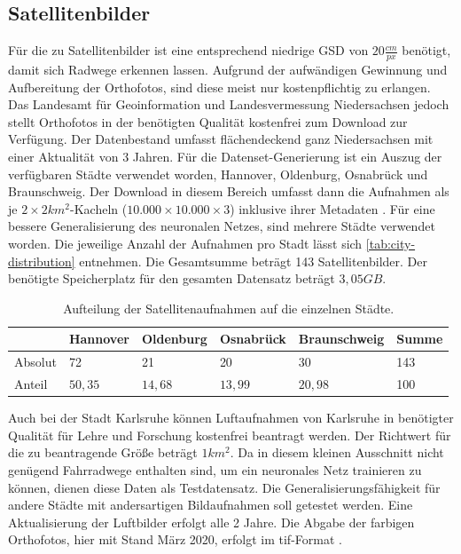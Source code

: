 \subsection{Satellitenbilder}

Für die zu Satellitenbilder ist eine entsprechend niedrige \ac{GSD} von $20 \frac{cm}{px}$ benötigt, damit sich Radwege erkennen lassen. 
Aufgrund der aufwändigen Gewinnung und Aufbereitung der Orthofotos, sind diese meist nur kostenpflichtig zu erlangen.
Das Landesamt für Geoinformation und Landesvermessung Niedersachsen jedoch stellt Orthofotos in der benötigten Qualität kostenfrei zum Download zur Verfügung.
Der Datenbestand umfasst flächendeckend ganz Niedersachsen mit einer Aktualität von 3 Jahren.
Für die Datenset-Generierung ist ein Auszug der verfügbaren Städte verwendet worden, Hannover, Oldenburg, Osnabrück und Braunschweig. 
Der Download in diesem Bereich umfasst dann die Aufnahmen als je $2\times2 km^2$-Kacheln ($10.000\times 10.000\times 3$) inklusive ihrer Metadaten \cite{.26.10.2022}.
Für eine bessere Generalisierung des neuronalen Netzes, sind mehrere Städte verwendet worden.
Die jeweilige Anzahl der Aufnahmen pro Stadt lässt sich \autoref{tab:city-distribution} entnehmen.
Die Gesamtsumme beträgt 143 Satellitenbilder.
Der benötigte Speicherplatz für den gesamten Datensatz beträgt $3,05 GB$.

\begin{table}
	\centering
	\begin{tabular}{l|l|l|l|l|l}
		& Hannover & Oldenburg & Osnabrück & Braunschweig & Summe\\
		\midrule
		Absolut & 72 & 21 & 20 & 30 & 143\\
		Anteil & $50,35$ & $14,68$ & $13,99$ & $20,98$ & 100 \\
	\end{tabular}
	\caption{Aufteilung der Satellitenaufnahmen auf die einzelnen Städte.}
	\label{tab:city-distribution}
\end{table}

Auch bei der Stadt Karlsruhe können Luftaufnahmen von Karlsruhe in benötigter Qualität für Lehre und Forschung kostenfrei beantragt werden.
Der Richtwert für die zu beantragende Größe beträgt $1km^2$.
Da in diesem kleinen Ausschnitt nicht genügend Fahrradwege enthalten sind, um ein neuronales Netz trainieren zu können, dienen diese Daten als Testdatensatz.
Die Generalisierungsfähigkeit für andere Städte mit andersartigen Bildaufnahmen soll getestet werden.
Eine Aktualisierung der Luftbilder erfolgt alle 2 Jahre.
Die Abgabe der farbigen Orthofotos, hier mit Stand März 2020, erfolgt im tif-Format \cite{.04.12.2022}.

